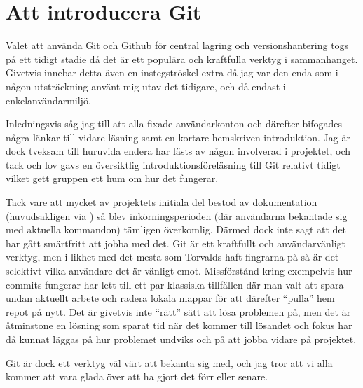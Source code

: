 \section{Att introducera Git}

Valet att använda Git och Github för central lagring och versionshantering togs på ett tidigt stadie då det är ett populära och kraftfulla verktyg i sammanhanget. Givetvis innebar detta även en instegströskel extra då jag var den enda som i någon utsträckning använt mig utav det tidigare, och då endast i enkelanvändarmiljö.

Inledningsvis såg jag till att alla fixade användarkonton och därefter bifogades några länkar till vidare läsning samt en kortare hemskriven introduktion. Jag är dock tveksam till huruvida endera har lästs av någon involverad i projektet, och tack och lov gavs en översiktlig introduktionsföreläsning till Git relativt tidigt vilket gett gruppen ett hum om hur det fungerar.

Tack vare att mycket av projektets initiala del bestod av dokumentation (huvudsakligen via \latex) så blev inkörningsperioden (där användarna bekantade sig med aktuella kommandon) tämligen överkomlig. Därmed dock inte sagt att det har gått smärtfritt att jobba med det. Git är ett kraftfullt och användarvänligt verktyg, men i likhet med det mesta som Torvalds haft fingrarna på så är det selektivt vilka användare det är vänligt emot. Missförstånd kring exempelvis hur commits fungerar har lett till ett par klassiska tillfällen där man valt att spara undan aktuellt arbete och radera lokala mappar för att därefter ``pulla'' hem repot på nytt. Det är givetvis inte ``rätt'' sätt att lösa problemen på, men det är åtminstone en lösning som sparat tid när det kommer till lösandet och fokus har då kunnat läggas på hur problemet undviks och på att jobba vidare på projektet.

Git är dock ett verktyg väl värt att bekanta sig med, och jag tror att vi alla kommer att vara glada över att ha gjort det förr eller senare.
